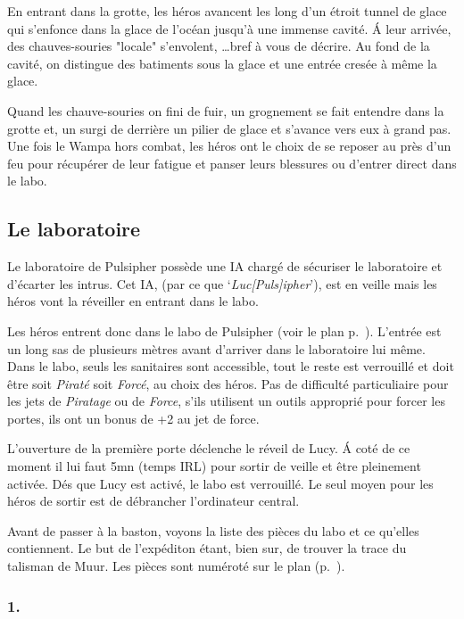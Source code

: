 En entrant dans la grotte, les héros avancent les long d’un étroit tunnel de glace qui s’enfonce dans la glace de l’océan jusqu’à une immense cavité. \'A leur arrivée, des chauves-souries "locale" s’envolent, \ldots bref à vous de décrire. Au fond de la cavité, on distingue des batiments sous la glace et une entrée cresée à même la glace.

Quand les chauve-souries on fini de fuir, un grognement se fait entendre dans la grotte et, un  surgi de derrière un pilier de glace et s’avance vers eux à grand pas.\\

Une fois le Wampa hors combat, les héros ont le choix de se reposer au près d’un feu pour récupérer de leur fatigue et panser leurs blessures ou d’entrer direct dans le labo.

\subsection{Le laboratoire}

Le laboratoire de Pulsipher possède une IA chargé de sécuriser le laboratoire et d’écarter les intrus. Cet IA,  (par ce que ‘\emph{Luc[Puls]ipher}’), est en veille mais les héros vont la réveiller en entrant dans le labo. 

Les héros entrent donc dans le labo de Pulsipher (voir le plan p.~\pageref{sec:plan-labo-pulsipher}). L’entrée est un long sas de plusieurs mètres avant d’arriver dans le laboratoire lui même. Dans le labo, seuls les sanitaires sont accessible, tout le reste est verrouillé et doit être soit \textit{Piraté} soit \textit{Forcé}, au choix des héros. Pas de difficulté particuliaire pour les jets de \textit{Piratage} ou de \textit{Force}, s’ils utilisent un outils approprié pour forcer les portes, ils ont un bonus de +2 au jet de force.

L’ouverture de la première porte déclenche le réveil de Lucy. \'A coté de ce moment il lui faut 5mn (temps IRL) pour sortir de veille et être pleinement activée. Dés que Lucy est activé, le labo est verrouillé. Le seul moyen pour les héros de sortir est de débrancher l’ordinateur central.

Avant de passer à la baston, voyons la liste des pièces du labo et ce qu’elles contiennent. Le but de l’expéditon étant, bien sur, de trouver la trace du talisman de Muur. Les pièces sont numéroté sur le plan (p.~\pageref{sec:plan-labo-pulsipher}).

\subsubsection{1. }

